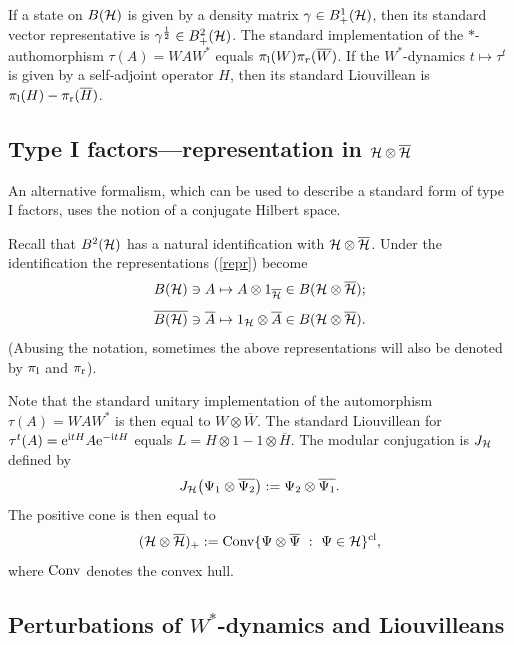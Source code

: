 \documentclass{svmult}
\def\Conv{{\rm Conv}}
\def\cl{{\rm cl}}
\def\bar{\overline}
\def\l{{\rm l}}
\def\r{{\rm r}}
\def\12{{\frac12}}
\def\i{{\rm i}}
\def\12{\frac{1}{2}}
\def\e{{\rm e}}
\def\one{{\bf 1}}
\def\cH{{\cal H}}
\def\l{{\rm l}}
\def\r{{\rm r}}
\def\12{\frac{1}{2}}
\def\e{{\rm e}}
\def\one{{ 1}}
\def\cH{{\cal H}}
\begin{document}
If a state on $B(\cH)$ is given by a density matrix $\gamma\in B_+^1(\cH)$,
then its standard vector representative is $\gamma^{\12}\in B^2_+(\cH)$. 
The standard implementation of the $*$-authomorphism
$\tau(A)=WAW^*$ equals $\pi_\l(W)\pi_r(\bar W)$.
If the $W^*$-dynamics $t\mapsto
\tau^t$ is given by a self-adjoint operator
$H$, then its standard Liouvillean is $\pi_\l(H)-\pi_\r(\bar H)$.


\subsection{Type I factors---representation in $\cH\otimes\bar\cH$}
\label{I.II}

An alternative formalism, which can be used to describe a
standard form of type I factors, uses the notion of a conjugate Hilbert space.

Recall  that $B^2(\cH)$ has a natural identification with
$\cH\otimes\bar\cH$. 
Under the identification 
 the representations (\ref{repr}) become
\begin{equation}\begin{array}{l}
B(\cH)\ni A\mapsto A\otimes 1_{\bar\cH}\in B(\cH\otimes\bar\cH);\\[3mm]
\bar{B(\cH)}\ni\bar A\mapsto1_{\cH}\otimes \bar A\in  B(\cH\otimes\bar\cH)
.\end{array}\label{repr1}\end{equation}
(Abusing the notation, sometimes the above representations will also be
denoted by $\pi_\l$ and $\pi_\r$).


 Note that the standard unitary implementation of the
automorphism $\tau(A)=WAW^*$ is then equal to  $W\otimes\bar W$. The
standard Liouvillean for $\tau^t(A)=\e^{\i tH}A\e^{-\i tH}$ equals
$L=H\otimes\one-\one\otimes\bar H$.
The modular conjugation  is $J_\cH$ defined by
\begin{equation} J_\cH\bigl(\Psi_1\otimes\bar{\Psi_2}\bigr):=
\Psi_2\otimes\bar{\Psi_1}.\label{jotk}\end{equation}
The positive cone is then equal to
\[(\cH\otimes\bar\cH)_+:=\Conv\{\Psi\otimes\bar\Psi\ :\ \Psi\in\cH\}^\cl
,\]
where $\Conv$ denotes the convex hull. 



\subsection{Perturbations of $W^*$-dynamics and Liouvilleans}
\end{document}

